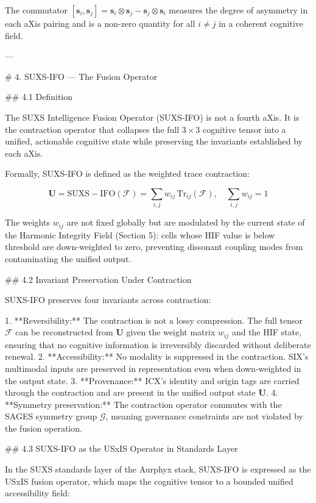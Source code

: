 The commutator \([\mathbf{s}_i, \mathbf{s}_j] = \mathbf{s}_i \otimes \mathbf{s}_j -
\mathbf{s}_j \otimes \mathbf{s}_i\) measures the degree of asymmetry in each
aXis pairing and is a non-zero quantity for all \(i \neq j\) in a coherent
cognitive field.

---

# 4. SUXS-IFO — The Fusion Operator

## 4.1 Definition

The SUXS Intelligence Fusion Operator (SUXS-IFO) is not a
fourth aXis. It is the contraction operator that collapses the full \(3 \times
3\) cognitive tensor into a unified, actionable cognitive state while preserving
the invariants established by each aXis.

Formally, SUXS-IFO is defined as the weighted trace contraction:

\[
\mathbf{U} = \mathrm{SUXS-IFO}(\mathcal{F}) = \sum_{i,j} w_{ij}\,
\mathrm{Tr}_{ij}(\mathcal{F}), \quad \sum_{i,j} w_{ij} = 1
\]

The weights \(w_{ij}\) are not fixed globally but are modulated by the current
state of the Harmonic Integrity Field (Section 5): cells whose HIF value is below
threshold are down-weighted to zero, preventing dissonant coupling modes from
contaminating the unified output.

## 4.2 Invariant Preservation Under Contraction

SUXS-IFO preserves four invariants across contraction:

1. **Reversibility:** The contraction is not a lossy compression. The full
   tensor \(\mathcal{F}\) can be reconstructed from \(\mathbf{U}\) given the
   weight matrix \(w_{ij}\) and the HIF state, ensuring that no cognitive
   information is irreversibly discarded without deliberate renewal.
2. **Accessibility:** No modality is suppressed in the contraction. SIX's
   multimodal inputs are preserved in representation even when down-weighted
   in the output state.
3. **Provenance:** ICX's identity and origin tags are carried through the
   contraction and are present in the unified output state \(\mathbf{U}\).
4. **Symmetry preservation:** The contraction operator commutes with the SAGES
   symmetry group \(\mathcal{G}\), meaning governance constraints are not
   violated by the fusion operation.

## 4.3 SUXS-IFO as the USxIS Operator in Standards Layer

In the SUXS standards layer of the Aurphyx stack, SUXS-IFO is expressed as the
USxIS fusion operator, which maps the cognitive tensor to a bounded unified
accessibility field:

